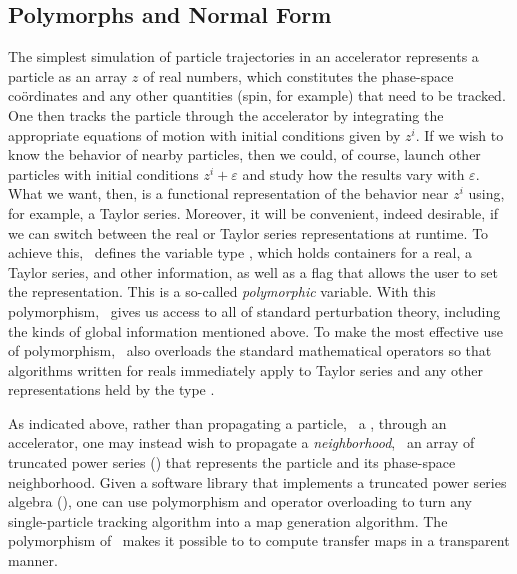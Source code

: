 \subsection{Polymorphs and Normal Form}

The simplest simulation of particle trajectories in an accelerator
represents a particle as an array $z$ of real numbers, which
constitutes the phase-space co\"ordinates and any other quantities
(spin, for example) that need to be tracked. One then tracks the
particle through the accelerator by integrating the appropriate
equations of motion with initial conditions given by $z^i$. If we
wish to know the behavior of nearby particles, then we could, of
course, launch other particles with initial conditions $z^i+\varepsilon$
and study how the results vary with $\varepsilon$. What we want,
then, is a functional representation of the behavior near $z^i$
using, for example, a Taylor series. Moreover, it will be convenient,
indeed desirable, if we can switch between the real or Taylor series
representations at runtime. To achieve this, \PTC\ defines the
variable type , which holds containers for a real,
a Taylor series, and other information, as well as a flag that
allows the user to set the representation. This 
is a so-called \emph{polymorphic} variable. With this polymorphism,
\PTC\ gives us access to all of standard perturbation theory,
including the kinds of global information mentioned above.
To make the most effective use of polymorphism, \PTC\ also overloads
the standard mathematical operators so that algorithms written for
reals immediately apply to Taylor series and any other representations
held by the type .

As indicated above, rather than propagating a particle,
\ie\ a , through an accelerator, one may instead wish
to propagate a \emph{neighborhood}, \ie\ an array of truncated power
series (\TPS) that represents the particle and its phase-space
neighborhood. Given a software library that implements a truncated power
series algebra (\TPSA), one can use polymorphism and operator
overloading to turn any single-particle tracking algorithm into a
map generation algorithm.
The polymorphism of \PTC\ makes it possible to to compute transfer
maps in a transparent manner.

